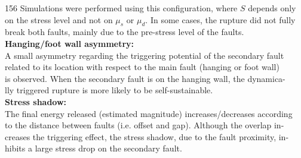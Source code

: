 \begin{poster}
{\begin{minipage}{0.55\linewidth}
\vskip 0.2cm
156 Simulations were performed using this configuration, where $S$ depends only \\
on the stress level and not on $\mu_s$ or $\mu_d$. In some cases, the rupture did not fully \\ 
break both faults, mainly due to the pre-stress level of the faults.\\
\vskip -0.2cm
\textbf{\small Hanging/foot wall asymmetry:} \\
\vskip -0.3cm
A small asymmetry regarding the triggering potential of the secondary fault \\ 
related to its location with respect to the main fault (hanging or foot wall)\\ 
is observed. When the secondary fault is on the hanging wall, the dynamica-\\
lly triggered rupture is more likely to be self-sustainable. \\
\vskip -0.2cm
\textbf{\small Stress shadow:} \\
\vskip -0.3cm
The final energy released (estimated magnitude) increases/decreases according \\
to the distance between faults (i.e. offset and gap). Although the overlap in-\\
creases the triggering effect, the stress shadow, due to the fault proximity, in-\\
hibits a large stress drop on the secondary fault.



\end{minipage}

}



\end{poster}
